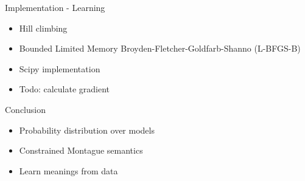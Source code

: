 \documentclass{beamer}
\newlength{\wideitemsep}
\let\olditem\item
\renewcommand{\item}{\setlength{\itemsep}{\wideitemsep}\olditem}
\begin{document}
\begin{frame}{Implementation - Learning}
  \begin{itemize}
  \item Hill climbing
  \item Bounded Limited Memory Broyden-Fletcher-Goldfarb-Shanno (L-BFGS-B)
  \item Scipy implementation 
  \item Todo: calculate gradient
  \end{itemize}
\end{frame}

\begin{frame}{Conclusion}
  \begin{itemize}
  \item Probability distribution over models
  \item Constrained Montague semantics
  \item Learn meanings from data
  \end{itemize}
\end{frame}


\end{document}
